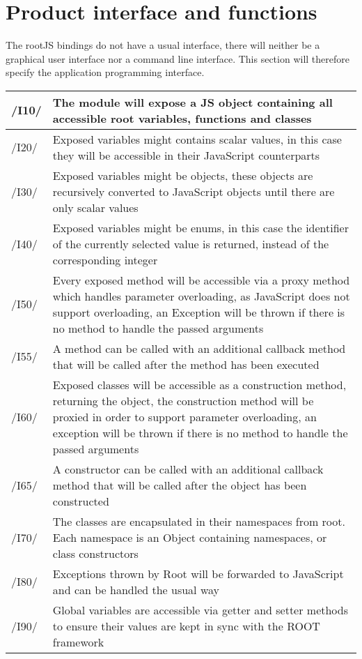 \chapter{Product interface and functions}
The rootJS bindings do not have a usual interface, there will neither be a graphical user interface nor a command line interface.
This section will therefore specify the application programming interface.


\begin{longtable}{|p{1cm} | p{15cm}|}
   \hline
  /I10/ & The module will expose a JS object containing all accessible root variables, functions and classes \\
  \hline
  /I20/ & Exposed variables might contains scalar values, in this case they will be accessible in their JavaScript counterparts \\
  \hline
  /I30/ & Exposed variables might be objects, these objects are recursively converted to JavaScript objects until there are only scalar values \\
  \hline
  /I40/ & Exposed variables might be enums, in this case the identifier of the currently selected value is returned, instead of the corresponding integer \\
  \hline
  /I50/ & Every exposed method will be accessible via a proxy method which handles parameter overloading, as JavaScript does not support overloading, an Exception will be thrown if there is no method to handle the passed arguments \\
  \hline
  /I55/ & A method can be called with an additional callback method that will be called after the method has been executed \\
  \hline
  /I60/ & Exposed classes will be accessible as a construction method, returning the object, the construction method will be proxied in order to support parameter overloading, an exception will be thrown if there is no method to handle the passed arguments \\
  \hline
  /I65/ & A constructor can be called with an additional callback method that will be called after the object has been constructed \\
  \hline
  /I70/ & The classes are encapsulated in their namespaces from root. Each namespace is an Object containing namespaces, or class constructors \\
  \hline
  /I80/ & Exceptions thrown by Root will be forwarded to JavaScript and can be handled the usual way \\
  \hline
  /I90/ & Global variables are accessible via getter and setter methods to ensure their values are kept in sync with the ROOT framework \\
   \hline
\end{longtable}
